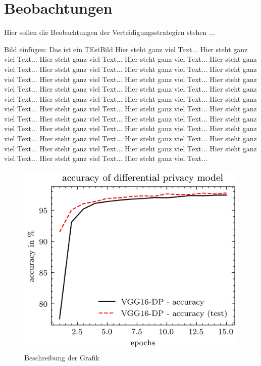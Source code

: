 \section{Beobachtungen} \label{chpt:Ergebnisse_Beobachtungen}
Hier sollen die Beobachtungen der Verteidigungsstrategien stehen ...

Bild einfügen: Das ist ein TEstBild
Hier steht ganz viel Text... Hier steht ganz viel Text... Hier steht ganz viel Text... Hier steht ganz viel Text... Hier steht ganz viel Text... Hier steht ganz viel Text... Hier steht ganz viel Text... Hier steht ganz viel Text... Hier steht ganz viel Text... Hier steht ganz viel Text... Hier steht ganz viel Text... Hier steht ganz viel Text... Hier steht ganz viel Text... Hier steht ganz viel Text... Hier steht ganz viel Text... Hier steht ganz viel Text... Hier steht ganz viel Text... Hier steht ganz viel Text... Hier steht ganz viel Text... Hier steht ganz viel Text... Hier steht ganz viel Text... Hier steht ganz viel Text... Hier steht ganz viel Text... Hier steht ganz viel Text... Hier steht ganz viel Text... Hier steht ganz viel Text... Hier steht ganz viel Text... Hier steht ganz viel Text... Hier steht ganz viel Text... Hier steht ganz viel Text... Hier steht ganz viel Text... Hier steht ganz viel Text... Hier steht ganz viel Text... Hier steht ganz viel Text... 
\begin{figure}
    \hspace{-10mm}
    \centering
	\includegraphics[]{Bilder/dp_acc.png}
	\caption{Beschreibung der Grafik}
\end{figure}
